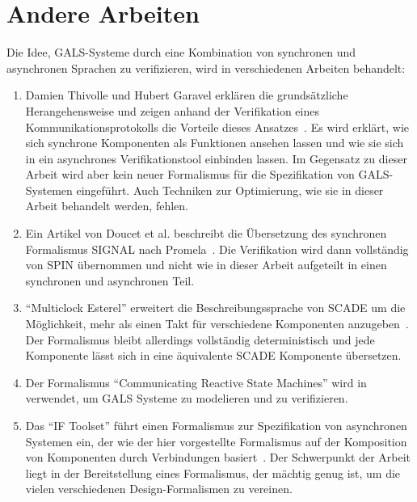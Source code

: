 \section{Andere Arbeiten}
\label{sec:related_works}
Die Idee, GALS-Systeme durch eine Kombination von synchronen und asynchronen Sprachen zu verifizieren, wird in verschiedenen Arbeiten behandelt:
\begin{enumerate}
\item Damien Thivolle und Hubert Garavel erklären die grundsätzliche Herangehensweise und zeigen anhand der Verifikation eines Kommunikationsprotokolls die Vorteile dieses Ansatzes~\cite{gals_sam}.
Es wird erklärt, wie sich synchrone Komponenten als Funktionen ansehen lassen und wie sie sich in ein asynchrones Verifikationstool einbinden lassen.
Im Gegensatz zu dieser Arbeit wird aber kein neuer Formalismus für die Spezifikation von GALS-Systemen eingeführt.
Auch Techniken zur Optimierung, wie sie in dieser Arbeit behandelt werden, fehlen.
\item Ein Artikel von Doucet et al. beschreibt die Übersetzung des synchronen Formalismus SIGNAL nach Promela~\cite{gals_signal}.
  Die Verifikation wird dann vollständig von SPIN übernommen und nicht wie in dieser Arbeit aufgeteilt in einen synchronen und asynchronen Teil.
\item "`Multiclock Esterel"' erweitert die Beschreibungssprache von SCADE um die Möglichkeit, mehr als einen Takt für verschiedene Komponenten anzugeben~\cite{multiclock_esterel}.
  Der Formalismus bleibt allerdings vollständig deterministisch und jede Komponente lässt sich in eine äquivalente SCADE Komponente übersetzen.
\item Der Formalismus "`Communicating Reactive State Machines"' wird in \cite{gals_crsm} verwendet, um GALS Systeme zu modelieren und zu verifizieren.
\item Das "`IF Toolset"' führt einen Formalismus zur Spezifikation von asynchronen Systemen ein, der wie der hier vorgestellte Formalismus auf der Komposition von Komponenten durch Verbindungen basiert~\cite{if_toolset}.
  Der Schwerpunkt der Arbeit liegt in der Bereitstellung eines Formalismus, der mächtig genug ist, um die vielen verschiedenen Design-Formalismen zu vereinen.
\end{enumerate}
